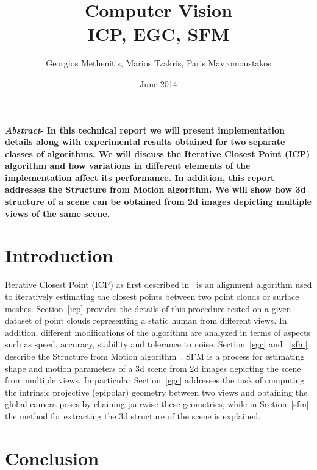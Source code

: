 \documentclass[11pt,twocolumn]{article}
\title{Computer Vision\\ICP, EGC, SFM}
\author{Georgios Methenitis, Marios Tzakris, Paris Mavromoustakos}
\affil{University of Amsterdam}
\date{June 2014}
\begin{document}
\maketitle

\renewcommand{\labelenumi}{\alph{enumi}.}



\textbf{\textit{Abstract}- In this technical report we will present implementation details along with experimental results obtained for two separate classes of algorithms. We will discuss the Iterative Closest Point (ICP) algorithm and how variations in different elements of the implementation affect its performance. In addition, this report addresses the Structure from Motion algorithm. We will show how 3d structure of a scene can be obtained from 2d images depicting multiple views of the same scene.}


\section{Introduction}
\label{introduction}
Iterative Closest Point (ICP) as first described in~\cite{icp} is an alignment algorithm used to iteratively estimating the closest points between two point clouds or surface meshes. Section~\ref{icp} provides the details of this procedure tested on a given dataset of point clouds representing a static human from different views. In addition, different modifications of the algorithm are analyzed in terms of aspects such as speed, accuracy, stability and tolerance to noise.
Section~\ref{egc} and ~\ref{sfm} describe the Structure from Motion algorithm~\cite{egc}. SFM is a process for estimating shape and motion parameters of a 3d scene from 2d images depicting the scene from multiple views. In particular Section~\ref{egc} addresses the task of computing the intrinsic projective (epipolar) geometry between two views and obtaining the global camera poses by chaining pairwise these geometries, while in Section~\ref{sfm} the method for extracting the 3d structure of the scene is explained.











\section{Conclusion}
\label{conclusion}
\end{document}
